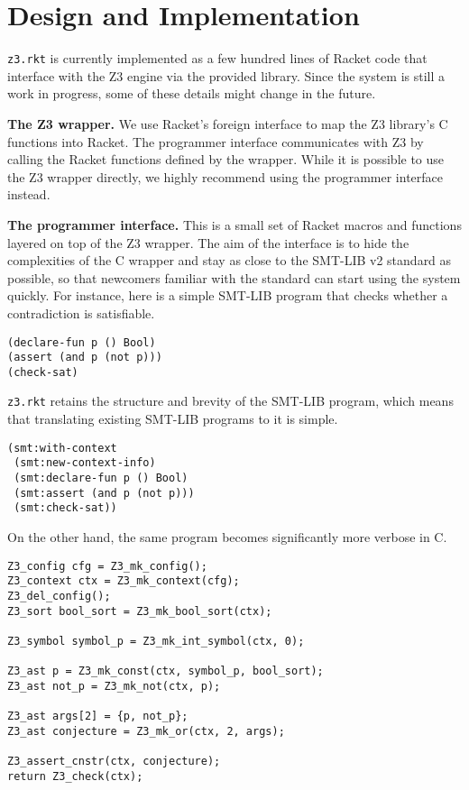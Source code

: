 \section{Design and Implementation}

\texttt{z3.rkt} is currently implemented as a few hundred lines of Racket code
that interface with the Z3 engine via the provided library. Since the system is
still a work in progress, some of these details might change in the future.

\textbf{The Z3 wrapper.} We use Racket's foreign interface \cite{racket/foreign}
to map the Z3 library's C functions into Racket. The programmer interface
communicates with Z3 by calling the Racket functions defined by the
wrapper. While it is possible to use the Z3 wrapper directly, we highly
recommend using the programmer interface instead.

\textbf{The programmer interface.} This is a small set of Racket macros and
functions layered on top of the Z3 wrapper. The aim of the interface is to hide
the complexities of the C wrapper and stay as close to the SMT-LIB v2 standard
\cite{smtlib2:10} as possible, so that newcomers familiar with the standard can
start using the system quickly. For instance, here is a simple SMT-LIB program
that checks whether a contradiction is satisfiable.

\begin{verbatim}
(declare-fun p () Bool)
(assert (and p (not p)))
(check-sat)
\end{verbatim}

\texttt{z3.rkt} retains the structure and brevity of the SMT-LIB program, which
means that translating existing SMT-LIB programs to it is simple.

\begin{verbatim}
(smt:with-context
 (smt:new-context-info)
 (smt:declare-fun p () Bool)
 (smt:assert (and p (not p)))
 (smt:check-sat))
\end{verbatim}

On the other hand, the same program becomes significantly more verbose in C.

\begin{verbatim}
Z3_config cfg = Z3_mk_config();
Z3_context ctx = Z3_mk_context(cfg);
Z3_del_config();
Z3_sort bool_sort = Z3_mk_bool_sort(ctx);

Z3_symbol symbol_p = Z3_mk_int_symbol(ctx, 0);

Z3_ast p = Z3_mk_const(ctx, symbol_p, bool_sort);
Z3_ast not_p = Z3_mk_not(ctx, p);

Z3_ast args[2] = {p, not_p};
Z3_ast conjecture = Z3_mk_or(ctx, 2, args);

Z3_assert_cnstr(ctx, conjecture);
return Z3_check(ctx);
\end{verbatim}

